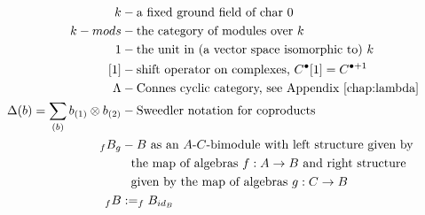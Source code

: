 \begin{align*}
k 
&-
\textrm{a fixed ground field of char 0}\\
%
k-mods
&- 
\textrm{the category of modules over $k$}\\
%
1
&-
\textrm{the unit in (a vector space 
isomorphic to) $k$}\\
%
[1]
&-
\textrm{shift operator on complexes, }
C^\bullet[1] = C^{\bullet+1}\\
\Lambda
&-
\textrm{Connes cyclic category, 
see Appendix \ref{chap:lambda}}\\
%
\Delta(b) = \sum_{(b)} b_{(1)} \otimes b_{(2)}
&-
\textrm{Sweedler notation for coproducts}\\
%
_fB_g 
&- 
\textrm{$B$ as an $A$-$C$-bimodule with left 
structure given by}\\
&\phantom{-} \textrm{the map of algebras $f:A\to B$ 
and right structure}\\
&\phantom{-} \textrm{given by the map of algebras 
$g:C \to B$}\\
%
_fB
&:=
_fB_{id_B}
\end{align*}